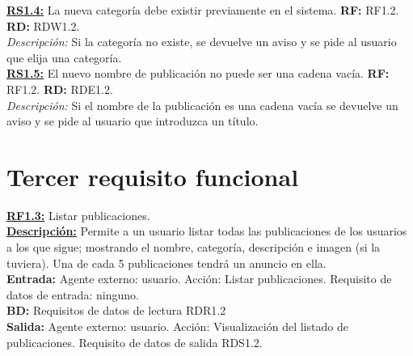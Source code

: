 \textbf{\textcolor{verde}{\underline{RS1.4:}}} La nueva categoría debe existir previamente en el sistema. \textbf{RF:} RF1.2. \textbf{RD:} RDW1.2. \\
\hspace*{1cm} \textit{Descripción:} Si la categoría no existe, se devuelve un aviso y se pide al 
usuario que elija una categoría. \\[12pt]

\textbf{\textcolor{verde}{\underline{RS1.5:}}} El nuevo nombre de publicación no puede ser una cadena vacía. \textbf{RF:} RF1.2. \textbf{RD:} RDE1.2. \\
\hspace*{1cm} \textit{Descripción:} Si el nombre de la publicación es una cadena vacía se devuelve un aviso y se pide al 
usuario que introduzca un título. \\[12pt]
\newpage


\section{Tercer requisito funcional}
\textbf{\textcolor{rojo}{\underline{RF1.3:}}} Listar publicaciones. \\[6pt]

\textbf{\textcolor{rojo}{\underline{Descripción:}}} Permite a un usuario listar todas las publicaciones 
de los usuarios a los que sigue; mostrando el nombre, categoría, descripción e imagen (si la tuviera). 
Una de cada 5 publicaciones tendrá un anuncio en ella.\\[6pt]

\textbf{\textcolor{rojo}{Entrada:}} Agente externo: usuario. Acción: Listar publicaciones. 
Requisito de datos de entrada: ninguno. \\[6pt]

\textbf{\textcolor{rojo}{BD:}} Requisitos de datos de lectura \textcolor{azul}{RDR1.2}\\[6pt]

\textbf{\textcolor{rojo}{Salida:}} Agente externo: usuario. Acción: Visualización 
del listado de publicaciones. Requisito de datos de salida \textcolor{azul}{RDS1.2}. \\[6pt]

